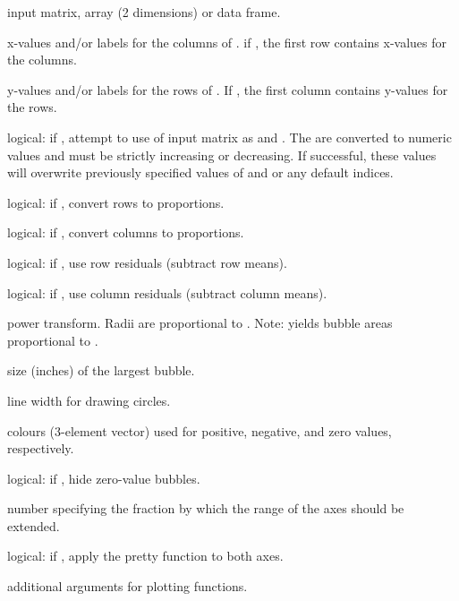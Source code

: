 \documentclass[letterpaper]{book}
\begin{document}
\begin{Arguments}
\begin{ldescription}
\item[\code{z}] input matrix, array (2 dimensions) or data frame.
\item[\code{xval}] x-values and/or labels for the columns of . 
if , the first row contains x-values for the columns.
\item[\code{yval}] y-values and/or labels for the rows of . 
If , the first column contains y-values for the rows.
\item[\code{dnam}] logical: if , attempt to use  of input
matrix  as  and . The  are 
converted to numeric values and must be strictly increasing or decreasing. 
If successful, these values will overwrite previously specified values
of  and  or any default indices.
\item[\code{rpro}] logical: if , convert rows to proportions.
\item[\code{cpro}] logical: if , convert columns to proportions.
\item[\code{rres}] logical: if , use row residuals (subtract row means).
\item[\code{cres}] logical: if , use column residuals (subtract column means).
\item[\code{powr}] power transform. Radii are proportional to . 
Note:  yields bubble areas proportional to .
\item[\code{size}] size (inches) of the largest bubble.
\item[\code{lwd}] line width for drawing circles.
\item[\code{clrs}] colours (3-element vector) used for positive, negative, 
and zero values, respectively.
\item[\code{hide0}] logical: if , hide zero-value bubbles.
\item[\code{frange}] number specifying the fraction by which the range of the axes should be extended.
\item[\code{prettyaxis}] logical: if , apply the pretty function to both axes.
\item[\code{...}] additional arguments for plotting functions.
\end{ldescription}
\end{Arguments}
\end{document}
